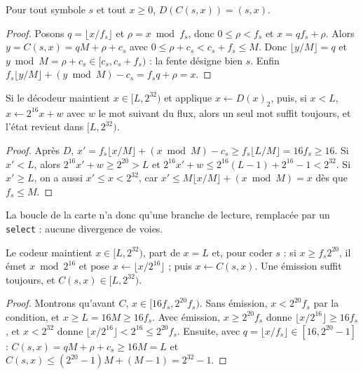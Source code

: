 \begin{lemme}[Inversion]\label{lem:rans-inversion}
Pour tout symbole $s$ et tout $x \ge 0$, $D(C(s,x)) = (s, x)$.
\end{lemme}

\begin{proof}
Posons $q = \lfloor x/f_s \rfloor$ et $\rho = x \bmod f_s$, donc $0 \le \rho < f_s$ et $x = q f_s + \rho$. Alors $y = C(s,x) = qM + \rho + c_s$ avec $0 \le \rho + c_s < c_s + f_s \le M$. Donc $\lfloor y/M \rfloor = q$ et $y \bmod M = \rho + c_s \in [c_s, c_s + f_s)$ : la fente désigne bien $s$. Enfin $f_s \lfloor y/M\rfloor + (y \bmod M) - c_s = f_s q + \rho = x$.
\end{proof}

\begin{lemme}\label{lem:rans-lecture}
Si le décodeur maintient $x \in [L, 2^{32})$ et applique $x \leftarrow D(x)_2$, puis, si $x < L$, $x \leftarrow 2^{16} x + w$ avec $w$ le mot suivant du flux, alors un seul mot suffit toujours, et l'état revient dans $[L, 2^{32})$.
\end{lemme}

\begin{proof}
Après $D$, $x' = f_s\lfloor x/M\rfloor + (x \bmod M) - c_s \ge f_s \lfloor L/M \rfloor = 16 f_s \ge 16$. Si $x' < L$, alors $2^{16}x' + w \ge 2^{20} > L$ et $2^{16} x' + w \le 2^{16}(L - 1) + 2^{16} - 1 < 2^{32}$. Si $x' \ge L$, on a aussi $x' \le x < 2^{32}$, car $x' \le M\lfloor x/M\rfloor + (x \bmod M) = x$ dès que $f_s \le M$.
\end{proof}

La boucle de la carte n'a donc qu'une branche de lecture, remplacée par un \texttt{select} : aucune divergence de voies.

\begin{lemme}\label{lem:rans-codeur}
Le codeur maintient $x \in [L, 2^{32})$, part de $x = L$ et, pour coder $s$ : si $x \ge f_s 2^{20}$, il émet $x \bmod 2^{16}$ et pose $x \leftarrow \lfloor x/2^{16} \rfloor$ ; puis $x \leftarrow C(s, x)$. Une émission suffit toujours, et $C(s,x) \in [L, 2^{32})$.
\end{lemme}

\begin{proof}
Montrons qu'avant $C$, $x \in [16 f_s, 2^{20} f_s)$. Sans émission, $x < 2^{20} f_s$ par la condition, et $x \ge L = 16M \ge 16 f_s$. Avec émission, $x \ge 2^{20} f_s$ donne $\lfloor x/2^{16}\rfloor \ge 16 f_s$, et $x < 2^{32}$ donne $\lfloor x/2^{16}\rfloor < 2^{16} \le 2^{20} f_s$. Ensuite, avec $q = \lfloor x/f_s\rfloor \in [16, 2^{20} - 1]$ : $C(s,x) = qM + \rho + c_s \ge 16 M = L$ et $C(s,x) \le (2^{20} - 1) M + (M - 1) = 2^{32} - 1$.
\end{proof}

